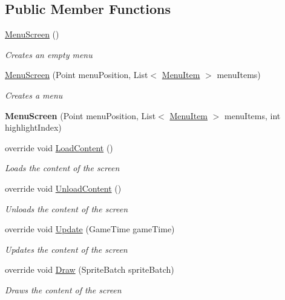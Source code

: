 \subsection*{Public Member Functions}
\begin{DoxyCompactItemize}
\item 
\hyperlink{class_hel_project_1_1_u_i_1_1_menu_1_1_menu_screen_af65f39a4c1755b8f24f63b264863ae5a}{Menu\+Screen} ()
\begin{DoxyCompactList}\small\item\em Creates an empty menu \end{DoxyCompactList}\item 
\hyperlink{class_hel_project_1_1_u_i_1_1_menu_1_1_menu_screen_a7c3ca1d57ddee8a977f5172df0070de1}{Menu\+Screen} (Point menu\+Position, List$<$ \hyperlink{class_hel_project_1_1_u_i_1_1_menu_1_1_menu_item}{Menu\+Item} $>$ menu\+Items)
\begin{DoxyCompactList}\small\item\em Creates a menu \end{DoxyCompactList}\item 
\hypertarget{class_hel_project_1_1_u_i_1_1_menu_1_1_menu_screen_af6bc8ddb3fb05ee92f857d95f914f56b}{}{\bfseries Menu\+Screen} (Point menu\+Position, List$<$ \hyperlink{class_hel_project_1_1_u_i_1_1_menu_1_1_menu_item}{Menu\+Item} $>$ menu\+Items, int highlight\+Index)\label{class_hel_project_1_1_u_i_1_1_menu_1_1_menu_screen_af6bc8ddb3fb05ee92f857d95f914f56b}

\item 
override void \hyperlink{class_hel_project_1_1_u_i_1_1_menu_1_1_menu_screen_a6a739ee514c5c05b13a91c5f520a3352}{Load\+Content} ()
\begin{DoxyCompactList}\small\item\em Loads the content of the screen \end{DoxyCompactList}\item 
override void \hyperlink{class_hel_project_1_1_u_i_1_1_menu_1_1_menu_screen_ace5a0a823194e4b39c38e146959e00e1}{Unload\+Content} ()
\begin{DoxyCompactList}\small\item\em Unloads the content of the screen \end{DoxyCompactList}\item 
override void \hyperlink{class_hel_project_1_1_u_i_1_1_menu_1_1_menu_screen_af7295758606c3cb7124983c86a51ecae}{Update} (Game\+Time game\+Time)
\begin{DoxyCompactList}\small\item\em Updates the content of the screen \end{DoxyCompactList}\item 
override void \hyperlink{class_hel_project_1_1_u_i_1_1_menu_1_1_menu_screen_a6a7f006379781977088ac588430c8822}{Draw} (Sprite\+Batch sprite\+Batch)
\begin{DoxyCompactList}\small\item\em Draws the content of the screen \end{DoxyCompactList}\end{DoxyCompactItemize}
